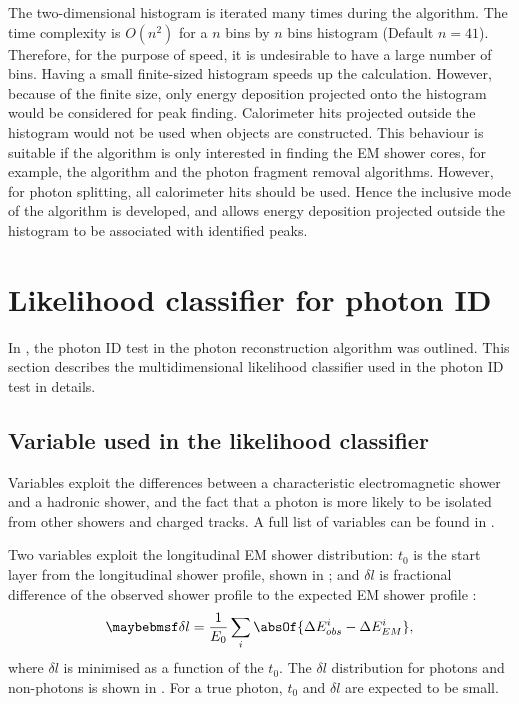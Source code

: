 The two-dimensional histogram is iterated many times during the algorithm. The time complexity is $O(n^2)$ for a $n$ bins by  $n$ bins histogram (Default $n = 41$). Therefore, for the purpose of speed, it is undesirable to have  a large number of bins. Having a small finite-sized histogram speeds up the calculation. However, because of the finite size, only energy deposition projected onto the histogram would be considered for peak finding. Calorimeter hits projected outside the histogram would not be used when \ShowerPeak objects are constructed. This behaviour is suitable if the algorithm is only interested in finding the EM shower cores, for example, the \PhotonReconstruction algorithm and the photon fragment removal algorithms. However, for photon splitting, all calorimeter hits should be used. Hence the inclusive mode of the \peakFinding algorithm is developed, and allows energy deposition projected outside the histogram to be associated with identified peaks.


\section{Likelihood classifier for photon ID}
\label{sec:photonLikelihood}

In , the photon ID test in the photon reconstruction algorithm was outlined. This section describes the multidimensional likelihood classifier used in the photon ID test in details.


\subsection{Variable used in the likelihood classifier}

Variables exploit the differences between a characteristic electromagnetic shower and a hadronic shower, and the fact that a photon is more likely to be isolated from other showers and charged tracks. A full list of variables can be found in .

Two variables exploit the longitudinal EM shower distribution: $t_0$ is the start layer from the longitudinal shower profile, shown in ; and $\delta{l}$ is fractional difference of the observed shower profile to the expected EM shower profile \cite{Thomson:2009rp}:
\begin{equation}
\delta l = \frac{1}{E_0}\sum_{i}^{}\absOf{\Delta E_{obs}^i - \Delta E_{EM}^i },
\end{equation}
where $\delta l$ is minimised as a function of the $t_0$. The $\delta l$ distribution for photons and non-photons is shown in . For a true photon, $t_0$  and $\delta l $ are expected to be small.

